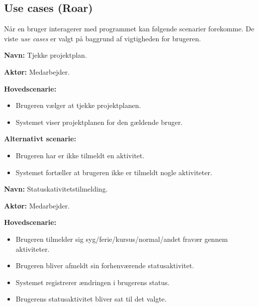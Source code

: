 \subsection{Use cases (Roar)}


Når en bruger interagerer med programmet kan følgende scenarier forekomme. De viste \textit{use cases} er valgt på baggrund af vigtigheden for brugeren.

\vspace{1 cm}

\textbf{Navn:} Tjekke projektplan. 

\textbf{Aktør:} Medarbejder.

\textbf{Hovedscenarie: }

\begin{itemize}
    \item Brugeren vælger at tjekke projektplanen.
    \item Systemet viser projektplanen for den gældende bruger.
\end{itemize}

\textbf{Alternativt scenarie:}

\begin{itemize}
    \item Brugeren har er ikke tilmeldt en aktivitet.
    \item Systemet fortæller at brugeren ikke er tilmeldt nogle aktiviteter.
\end{itemize}

\vspace{1 cm}

\textbf{Navn:} Statuskativitetstilmelding.

\textbf{Aktør:} Medarbejder.

\textbf{Hovedscenarie: }

\begin{itemize}
    \item Brugeren tilmelder sig syg/ferie/kursus/normal/andet fravær gennem aktiviteter.
    \item Brugeren bliver afmeldt sin forhenværende statusaktivitet.
    \item Systemet registrerer ændringen i brugerens status. 
    \item Brugerens statusaktivitet bliver sat til det valgte.
\end{itemize}

